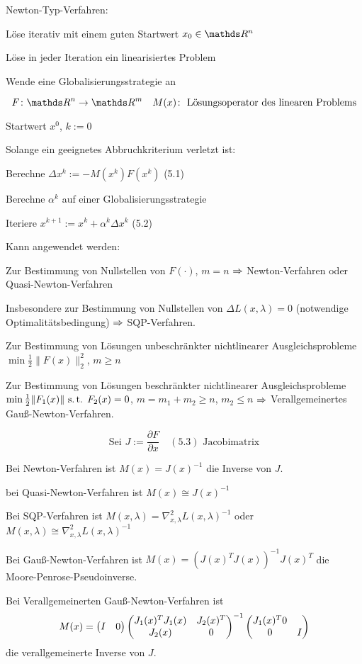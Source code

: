 

Newton-Typ-Verfahren:

\bitm
\item Löse iterativ mit einem guten Startwert $x_0 \in \R^n$
\item Löse in jeder Iteration ein linearisiertes Problem
\item Wende eine Globalisierungsstrategie an
\eitm

\[ F\colon \R^n \to \R^m \quad M(x)\colon \text{ Lösungsoperator des linearen Problems} \]


\bitm
\item Startwert $x^0$, $k := 0$
\item Solange ein geeignetes Abbruchkriterium verletzt ist:
\bitm
	\item Berechne $\Delta x^k := - M(x^k) F(x^k)$ (5.1)
	\item Berechne $\alpha^k$ auf einer Globalisierungsstrategie
	\item Iteriere $x^{k+1} := x^k + \alpha^k \Delta x^k$ (5.2)
\eitm
\eitm

Kann angewendet werden:

\bitm
\item Zur Bestimmung von Nullstellen von $F(\cdot)$, $m=n$ $\Rightarrow$ Newton-Verfahren oder Quasi-Newton-Verfahren
\item Insbesondere zur Bestimmung von Nullstellen von $\Delta L(x,\lambda) = 0$ (notwendige Optimalitätsbedingung) $\Rightarrow$ SQP-Verfahren.
\item Zur Bestimmung von Lösungen unbeschränkter nichtlinearer Ausgleichsprobleme $\min \frac 12 \|F(x)\|_2^2$, $m \geq n$
\item Zur Bestimmung von Lösungen beschränkter nichtlinearer Ausgleichsprobleme $\min \frac 12 \|F_1(x)\| \text{ s.\,t. } F_2(x) = 0$, $m = m_1+m_2 \geq n$, $m_2 \leq n$ $\Rightarrow$ Verallgemeinertes Gauß-Newton-Verfahren.
\eitm

\[ \text{Sei } J := \frac{\partial F}{\partial x} \quad (5.3) \text{ Jacobimatrix} \]


\bitm
\item Bei Newton-Verfahren ist $M(x) = J(x)^{-1}$ die Inverse von $J$.
\item bei Quasi-Newton-Verfahren ist $M(x) \cong J(x)^{-1}$
\item Bei SQP-Verfahren ist $M(x, \lambda) = \nabla_{x,\lambda}^2 L(x, \lambda)^{-1}$ oder 
$M(x, \lambda) \cong \nabla_{x,\lambda}^2 L(x, \lambda)^{-1}$
\item Bei Gauß-Newton-Verfahren ist $M(x) = (J(x)^T J(x))^{-1} J(x)^T$ die Moore-Penrose-Pseudoinverse.
\item Bei Verallgemeinerten Gauß-Newton-Verfahren ist \[ M(x) = \begin{pmatrix} I & 0 \end{pmatrix} \begin{pmatrix} J_1(x)^T J_1(x) & J_2(x)^T \\ J_2(x) & 0 \end{pmatrix}^{-1} \begin{pmatrix} J_1(x)^T 0 \\ 0 & I \end{pmatrix} \] die verallgemeinerte Inverse von $J$.
\eitm

